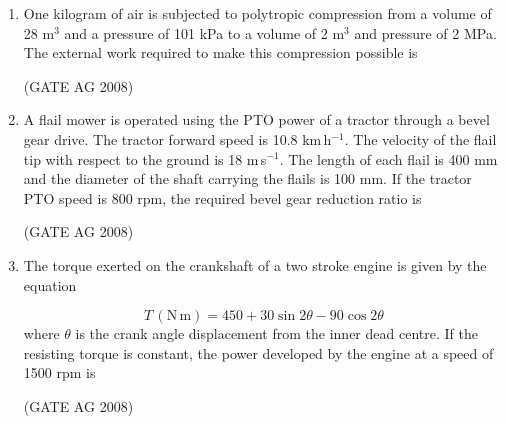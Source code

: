 \documentclass[journal,12pt,onecolumn]{IEEEtran}
\begin{document}
\begin{enumerate}
\medskip

\item 
 One kilogram of air is subjected to polytropic compression from a volume of 28 m$^3$ and a pressure of 101 kPa to a volume of 2 m$^3$ and pressure of 2 MPa. The external work required to make this compression possible is
\begin{enumerate}
\end{enumerate}
\hfill(GATE AG 2008)\\

\medskip

\item 
 A flail mower is operated using the PTO power of a tractor through a bevel gear drive. The tractor forward speed is 10.8 km\,h$^{-1}$. The velocity of the flail tip with respect to the ground is 18 m\,s$^{-1}$. The length of each flail is 400 mm and the diameter of the shaft carrying the flails is 100 mm. If the tractor PTO speed is 800 rpm, the required bevel gear reduction ratio is
\begin{enumerate}
\end{enumerate}
\hfill(GATE AG 2008)\\

\medskip

\item 
 The torque exerted on the crankshaft of a two stroke engine is given by the equation

\[T \, (\mathrm{N\,m}) = 450 + 30 \sin 2\theta - 90 \cos 2\theta\]
where $\theta$ is the crank angle displacement from the inner dead centre. If the resisting torque is constant, the power developed by the engine at a speed of 1500 rpm is
\begin{enumerate}
\end{enumerate}
\hfill(GATE AG 2008)\\


\end{enumerate}
\end{document}
